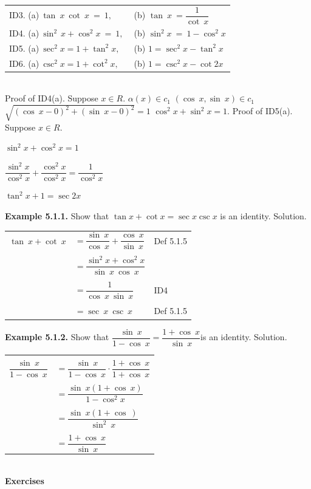 \newpage
\begin{tabular}{l l}
ID3. (a)$~ \tan ~x ~\cot~ x ~=~1,$ &(b) $ \tan~ x~= \dfrac{1}{\cot~x}$\\

ID4. (a)$~\sin^{2~}x + \cos^{2}x~=~1,~$ &(b) $ \sin^{2}x~=~1 - \cos^{2}x$\\

ID5. (a)$~\sec^{2}x = 1 + \tan^{2}x,$& (b) $ 1 = \sec^{2}x - \tan^{2}x$\\

ID6. (a)$~\csc^{2}x = 1 + \cot^{2}x,$& (b) $1 = \csc^{2}x - \cot{2}x$\\
\end{tabular}\\
Proof of ID4(a). Suppose $x\in R$.\nl
$\alpha(x) \in c_{1}$\nl
$(\cos~ x, \sin ~x)\in c_{1}$\nl
$\sqrt{(\cos~x - 0)^{2} + (\sin~x - 0)^{2}} = 1 $ \nl
$\cos^{2}x + \sin^{2}x = 1. $\nl
Proof of ID5(a). Suppose $x\in R$. \nl

$\sin^{2}x + \cos^{2}x = 1$\nl

$\dfrac{\sin^{2}x}{\cos^{2}x} + \dfrac{\cos^{2}x}{\cos^{2}x} = \dfrac{1}{\cos^{2}x}$\nl

$\tan^{2}x + 1 = \sec{2}x$\nl

\textbf{Example 5.1.1.} Show that $\tan x + \cot x = \sec x \csc x$ is an identity. \nl
Solution. \nl
\begin{tabular}{r l l}
$\tan ~x + \cot~ x$ & $= \dfrac{\sin~ x}{\cos ~x} + \dfrac{\cos ~x}{\sin~ x}$ & Def 5.1.5 \\
&&\\
& $= \dfrac{\sin^{2}x + \cos^{2}x}{\sin~x ~\cos~x}$& \\
&&\\
&$=\dfrac{1}{\cos~x ~\sin~x}$&ID4\\
&&\\
&$= \sec~x ~\csc~x$&Def 5.1.5

\end{tabular}


\textbf{Example 5.1.2.} Show that  $\dfrac{\sin~x}{1 - \cos~x} = \dfrac{1 + \cos~x}{\sin~x}$is an identity. \nl
Solution.  \nl
\begin{tabular}{r l}
&\\
$\dfrac{\sin ~ x}{1 -\cos~x}$&$= \dfrac{\sin~x}{1 - \cos~x}\cdot \dfrac{1 + \cos~x}{1 + \cos~x}$\\
&\\
&$=\dfrac{\sin~x(1 + \cos~x)}{1 - \cos^{2}x}$\\
&\\
&$=\dfrac{\sin~x(1 + \cos~)}{\sin^{2}~x}$\\
&\\
&$=\dfrac{1 + \cos~x}{\sin ~x}$\\
\end{tabular}\\
\newpage
\textbf{Exercises}\nl

